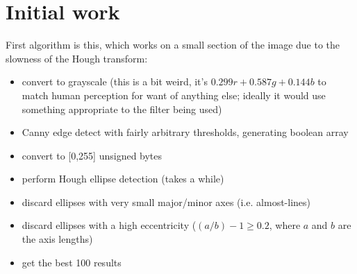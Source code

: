 

\section{Initial work}
First algorithm is this, which works on a small section of the image due to the
slowness of the Hough transform:
\begin{itemize}
\item convert to grayscale (this is a bit weird, it's
$0.299r+0.587g+0.144b$ to match human perception for want of anything else; ideally
it would use something appropriate to the filter being used)
\item Canny edge detect with fairly arbitrary thresholds, generating boolean array
\item convert to [0,255] unsigned bytes
\item perform Hough ellipse detection (takes a while)
\item discard ellipses with very small major/minor axes (i.e. almost-lines)
\item discard ellipses with a high eccentricity ($(a/b)-1 \ge 0.2$, where $a$ and $b$ are
the axis lengths)
\item get the best 100 results
\end{itemize}

